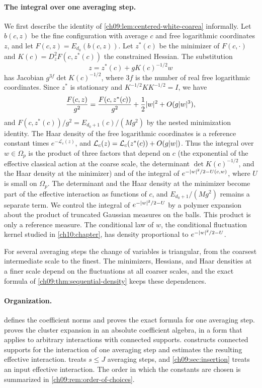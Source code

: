 \paragraph{The integral over one averaging step.}
We first describe the identity of \cref{ch09:lem:centered-white-coarea} informally. Let $b(c,z)$ be the fine configuration with average $c$ and free logarithmic coordinates $z$, and let $F(c,z)=E_{d_0}(b(c,z))$. Let $z^*(c)$ be the minimizer of $F(c,\cdot)$ and $K(c)=D_z^2F(c,z^*(c))$ the constrained Hessian. The substitution
\[
 z=z^*(c)+gK(c)^{-1/2}w
\]
has Jacobian $g^{3f}\det K(c)^{-1/2}$, where $3f$ is the number of real free logarithmic coordinates. Since $z^*$ is stationary and $K^{-1/2}KK^{-1/2}=I$, we have
\[
 \frac{F(c,z)}{g^2}=\frac{F(c,z^*(c))}{g^2}+\frac12\lvert w\rvert^2+O(g\lvert w\rvert^3),
\]
and $F(c,z^*(c))/g^2=E_{d_0+1}(c)/(Mg^2)$ by the nested minimization identity. The Haar density of the free logarithmic coordinates is a reference constant times $e^{-\mathcal L_c(z)}$, and $\mathcal L_c(z)=\mathcal L_c(z^*(c))+O(g\lvert w\rvert)$. Thus the integral over $w\in\Omega_p$ is the product of three factors that depend on $c$ (the exponential of the effective classical action at the coarse scale, the determinant $\det K(c)^{-1/2}$, and the Haar density at the minimizer) and of the integral of $e^{-\lvert w\rvert^2/2-U(c,w)}$, where $U$ is small on $\Omega_p$. The determinant and the Haar density at the minimizer become part of the effective interaction as functions of $c$, and $E_{d_0+1}/(Mg^2)$ remains a separate term. We control the integral of $e^{-\lvert w\rvert^2/2-U}$ by a polymer expansion about the product of truncated Gaussian measures on the balls. This product is only a reference measure. The conditional law of $w$, the conditional fluctuation kernel studied in \cref{ch10:chapter}, has density proportional to $e^{-\lvert w\rvert^2/2-U}$.

For several averaging steps the change of variables is triangular, from the coarsest intermediate scale to the finest. The minimizers, Hessians, and Haar densities at a finer scale depend on the fluctuations at all coarser scales, and the exact formula of \cref{ch09:thm:sequential-density} keeps these dependences.

\paragraph{Organization.}
 defines the coefficient norms and proves the exact formula for one averaging step.  proves the cluster expansion in an absolute coefficient algebra, in a form that applies to arbitrary interactions with connected supports.  constructs connected supports for the interaction of one averaging step and estimates the resulting effective interaction.  treats $s\le J$ averaging steps, and \cref{ch09:sec:insertion} treats an input effective interaction. The order in which the constants are chosen is summarized in \cref{ch09:rem:order-of-choices}.

